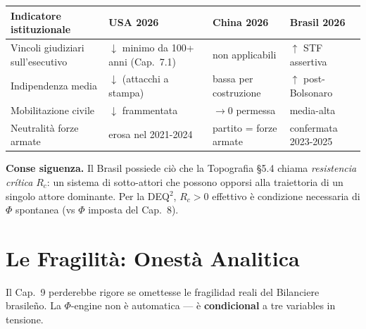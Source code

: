 {\def\LTcaptype{none} %
{\small\begin{longtable}[]{@{}
  >{\raggedright\arraybackslash}p{}
  >{\raggedright\arraybackslash}p{}
  >{\raggedright\arraybackslash}p{}
  >{\raggedright\arraybackslash}p{}@{}}
\toprule\noalign{}
\begin{minipage}[b]{\linewidth}\raggedright
Indicatore istituzionale
\end{minipage} & \begin{minipage}[b]{\linewidth}\raggedright
USA 2026
\end{minipage} & \begin{minipage}[b]{\linewidth}\raggedright
China 2026
\end{minipage} & \begin{minipage}[b]{\linewidth}\raggedright
Brasil 2026
\end{minipage} \\
\midrule\noalign{}
\endhead
\bottomrule\noalign{}
\endlastfoot
Vincoli giudiziari sull'esecutivo & \(\downarrow\) minimo da 100+ anni
(Cap.~7.1) & non applicabili & \(\uparrow\) STF assertiva \\
Indipendenza media & \(\downarrow\) (attacchi a stampa) & bassa per
costruzione & \(\uparrow\) post-Bolsonaro \\
Mobilitazione civile & \(\downarrow\) frammentata & \(\to 0\) permessa &
media-alta \\
Neutralità forze armate & erosa nel 2021-2024 & partito = forze armate &
confermata 2023-2025 \\
\end{longtable}}
}

\Proved{} \textbf{Conse siguenza.} Il Brasil possiede ciò che la
Topografia \S{}5.4 chiama \emph{resistencia crítica} \(R_c\): un sistema di
sotto-attori che possono opporsi alla traiettoria di un singolo attore
dominante. Per la DEQ$^2$, \(R_c > 0\) effettivo è condizione necessaria di
\(\Phi\) spontanea (vs \(\Phi\) imposta del Cap.~8).



\section{Le Fragilità: Onestà
Analitica}\label{le-fragilituxe0-onestuxe0-analitica}

Il Cap.~9 perderebbe rigore se omettesse le fragilidad reali del
Bilanciere brasileño. La \(\Phi\)-engine non è automatica --- è
\textbf{condicional} a tre variables in tensione.

